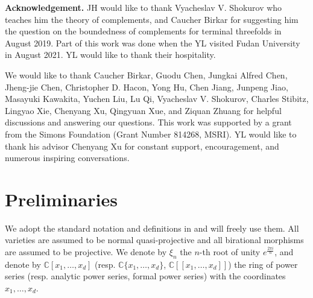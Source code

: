 \documentclass[11pt]{amsart}
\numberwithin{equation}{section}
\newcommand{\Cc}{\mathbb{C}}
\newcommand{\KK}{\mathbb{K}}
\newcommand{\Qq}{\mathbb{Q}}
\newcommand{\Rr}{\mathbb{R}}
\theoremstyle{definition}
\theoremstyle{definition}
\begin{document}
\medskip
\noindent \textbf{Acknowledgement.} JH would like to thank Vyacheslav V. Shokurov who teaches him the theory of complements, and Caucher Birkar for suggesting him the question on the boundedness of complements for terminal threefolds in August 2019. Part of this work was done when the YL visited Fudan University in August 2021. YL would like to thank their hospitality.

We would like to thank Caucher Birkar, Guodu Chen, Jungkai Alfred Chen, Jheng-jie Chen, Christopher D. Hacon, Yong Hu, Chen Jiang, Junpeng Jiao, Masayuki Kawakita, Yuchen Liu, Lu Qi, Vyacheslav V. Shokurov, Charles Stibitz, Lingyao Xie, Chenyang Xu, Qingyuan Xue, and Ziquan Zhuang for helpful discussions and answering our questions. This work was supported by a grant from the Simons Foundation (Grant Number 814268, MSRI). YL would like to thank his advisor Chenyang Xu for constant support, encouragement, and numerous inspiring conversations. 


\section{Preliminaries}

We adopt the standard notation and definitions in \cite{KM98,BCHM10} and will freely use them. All varieties are assumed to be normal quasi-projective and all birational morphisms are assumed to be projective. We denote by $\xi_n$ the $n$-th root of unity $e^{\frac{2\pi i}{n}}$, and denote by $\Cc[x_1,\dots,x_d]$ (resp. $\Cc\{x_1,\dots,x_d\}$, $\Cc[[x_1,\dots,x_d]]$) the ring of power series (resp. analytic power series, formal power series) with the coordinates $x_1,\dots,x_d$.

\end{document}

